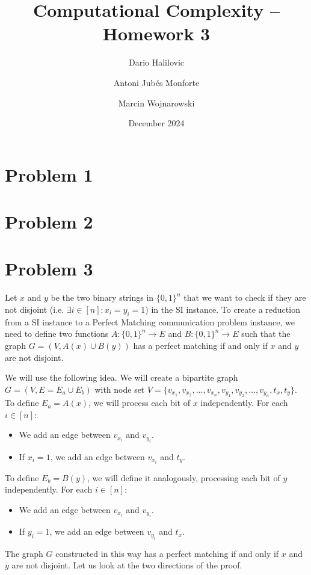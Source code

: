 \documentclass{article}
\title{Computational Complexity -- Homework 3}
\author{Dario Halilovic\and
Antoni Jubés Monforte\and
Marcin Wojnarowski}
\date{December 2024}
\begin{document}
\maketitle

\section*{Problem 1}

\section*{Problem 2}

\section*{Problem 3}

Let $x$ and $y$ be the two binary strings in $\{0,1\}^n$ that we want to check if they are not disjoint (i.e. $\exists i \in [n]: x_i = y_i = 1$) in the SI instance. To create a reduction from a SI instance to a Perfect Matching communication problem instance, we need to define two functions $A: \{0,1\}^n \to E$ and $B: \{0,1\}^n \to E$ such that the graph $G=(V,A(x)\cup B(y))$ has a perfect matching if and only if $x$ and $y$ are not disjoint.

We will use the following idea. We will create a bipartite graph $G = (V, E = E_a \cup E_b)$ with node set $V = \{v_{x_1}, v_{x_2}, \ldots, v_{x_n}, v_{y_1}, v_{y_2}, \ldots, v_{y_n}, t_x, t_y\}$. To define $E_a = A(x)$, we will process each bit of $x$ independently. For each $i\in [n]$:

\begin{itemize}
    \item We add an edge between $v_{x_i}$ and $v_{y_i}$.
    \item If $x_i = 1$, we add an edge between $v_{x_i}$ and $t_y$.
\end{itemize}

To define $E_b = B(y)$, we will define it analogously, processing each bit of $y$ independently. For each $i\in [n]$:

\begin{itemize}
    \item We add an edge between $v_{x_i}$ and $v_{y_i}$.
    \item If $y_i = 1$, we add an edge between $v_{y_i}$ and $t_x$.
\end{itemize}

The graph $G$ constructed in this way has a perfect matching if and only if $x$ and $y$ are not disjoint. Let us look at the two directions of the proof.
\end{document}
